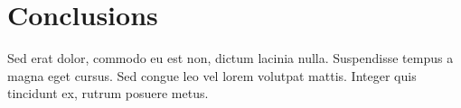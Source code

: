 \documentclass[a4paper, 11pt]{article}
\begin{document}
\section{Conclusions}
\label{section:conclusions}

Sed erat dolor, commodo eu est non, dictum lacinia nulla. Suspendisse tempus a magna eget cursus. Sed congue leo vel lorem volutpat mattis. Integer quis tincidunt ex, rutrum posuere metus.



\clearpage


\nocite{*}

\raggedright %
%
\end{document}
